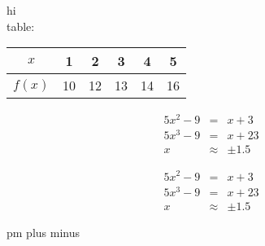 \documentclass[10]{article}
\begin{document}
hi\\



 table:
\begin{tabular}{|c | c | c | c c c| }
\hline
$x$ & 1 & 2 & 3 & 4 & 5\\  \hline
$f(x)$ &  10 & 12 & 13 & 14 & 16\\ \hline
\end{tabular}

\begin{eqnarray*}
5x^2-9&=&x+3\\
5x^3-9&=&x+23\\
x&\approx&\pm1.5
\end{eqnarray*}


\begin{eqnarray}
5x^2-9&=&x+3\\
5x^3-9&=&x+23\\
x&\approx&\pm1.5
\end{eqnarray}


pm plus minus
\end{document}
